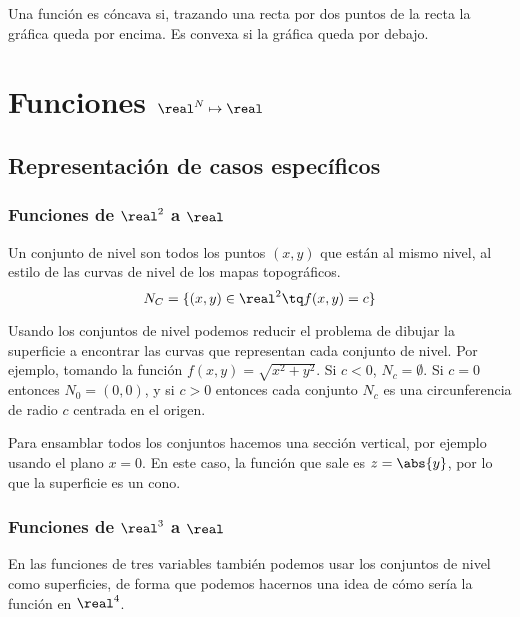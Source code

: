 \documentclass[12pt,a4paper,titlepage]{apuntes}
\begin{document}
\begin{defn} Una función es cóncava si, trazando una recta por dos puntos de la recta la gráfica queda por encima. Es convexa si la gráfica queda por debajo.\end{defn}
\section{Funciones $\real^N\mapsto\real$}

\subsection{Representación de casos específicos}
\subsubsection{Funciones de $\real^2$ a $\real$}

\begin{defn} Un conjunto de nivel son todos los puntos $(x,y)$ que están al mismo nivel, al estilo de las curvas de nivel de los mapas topográficos.
\[ N_C=\{ (x,y) \in \real^2 \tq f(x,y) = c \} \]
\end{defn}

Usando los conjuntos de nivel podemos reducir el problema de dibujar la superficie a encontrar las curvas que representan cada conjunto de nivel. Por ejemplo, tomando la función $f(x,y) = \sqrt{x^2+y^2}$. Si $c<0$, $N_c = \emptyset$. Si $c = 0$ entonces $N_0 = (0,0)$, y si $c>0$ entonces cada conjunto $N_c$ es una circunferencia de radio $c$ centrada en el origen.

Para ensamblar todos los conjuntos hacemos una sección vertical, por ejemplo usando el plano $x=0$. En este caso, la función que sale es $z=\abs{y}$, por lo que la superficie es un cono.


\subsubsection{Funciones de $\real^3$ a $\real$}

En las funciones de tres variables también podemos usar los conjuntos de nivel como superficies, de forma que podemos hacernos una idea de cómo sería la función en $\real^4$.
\end{document}
